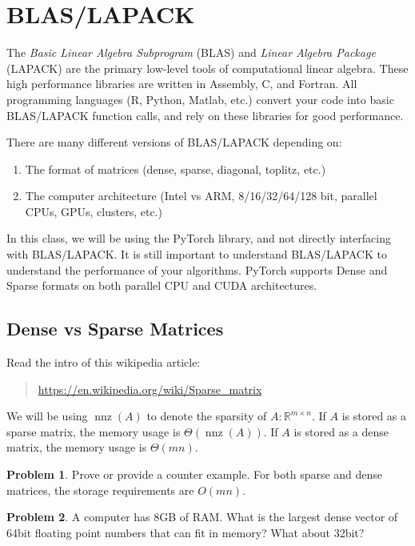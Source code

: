 \documentclass[10pt]{article}
\theoremstyle{definition}
\newtheorem{problem}{Problem}
\newcommand{\R}{\mathbb R}
\DeclareMathOperator{\nnz}{nnz}
\begin{document}
\newpage
\section{BLAS/LAPACK}

The \emph{Basic Linear Algebra Subprogram} (BLAS) and \emph{Linear Algebra Package} (LAPACK) are the primary low-level tools of computational linear algebra.
These high performance libraries are written in Assembly, C, and Fortran.
All programming languages (R, Python, Matlab, etc.) convert your code into basic BLAS/LAPACK function calls,
and rely on these libraries for good performance.

There are many different versions of BLAS/LAPACK depending on:
\begin{enumerate}
    \item The format of matrices (dense, sparse, diagonal, toplitz, etc.)
    \item The computer architecture (Intel vs ARM, 8/16/32/64/128 bit, parallel CPUs, GPUs, clusters, etc.)
\end{enumerate}
In this class, we will be using the PyTorch library,
and not directly interfacing with BLAS/LAPACK.
It is still important to understand BLAS/LAPACK to understand the performance of your algorithms.
PyTorch supports Dense and Sparse formats on both parallel CPU and CUDA architectures.

\subsection{Dense vs Sparse Matrices}

Read the intro of this wikipedia article:
\begin{quote}
    \url{https://en.wikipedia.org/wiki/Sparse_matrix}
\end{quote}
We will be using $\nnz(A)$ to denote the sparsity of $A:\R^{m\times n}$.
If $A$ is stored as a sparse matrix,
the memory usage is $\Theta(\nnz(A))$.
If $A$ is stored as a dense matrix,
the memory usage is $\Theta(mn)$.

\begin{problem}
    Prove or provide a counter example.
    For both sparse and dense matrices,
    the storage requirements are $O(mn)$.
    \vspace{2in}
\end{problem}

\begin{problem}
    A computer has 8GB of RAM.
    What is the largest dense vector of 64bit floating point numbers that can fit in memory?
    What about 32bit?
    \vspace{2in}
\end{problem}
\end{document}
